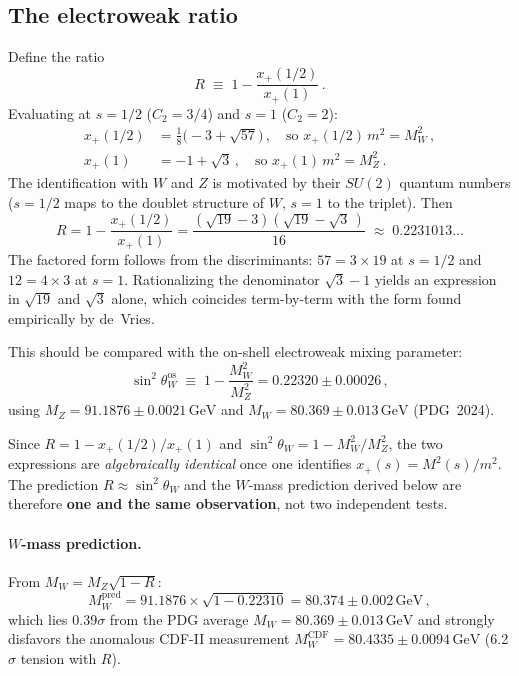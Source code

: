 \documentclass[12pt,a4paper]{article}
\newcommand{\GeV}{\,\text{GeV}}
\begin{document}
\subsection{The electroweak ratio}
Define the ratio
\begin{equation}
R \;\equiv\; 1 - \frac{x_+(1/2)}{x_+(1)}\,.
\end{equation}
Evaluating at $s = 1/2$ ($C_2 = 3/4$)
and $s = 1$ ($C_2 = 2$):
\begin{align}
x_+(1/2) &= \tfrac{1}{8}\bigl(-3 + \sqrt{57}\bigr)
  \,,\quad\text{so } x_+(1/2)\,m^2 = M_W^2\,,
\\[4pt]
x_+(1) &= -1 + \sqrt{3}
  \,,\quad\text{so } x_+(1)\,m^2 = M_Z^2\,.
\end{align}
The identification with $W$ and $Z$ is motivated by their
$SU(2)$ quantum numbers ($s = 1/2$ maps to the doublet structure of $W$,
$s = 1$ to the triplet).  Then
\begin{equation}
\boxed{R = 1 - \frac{x_+(1/2)}{x_+(1)}
  = \frac{(\sqrt{19} - 3)(\sqrt{19} - \sqrt{3}\,)}{16}
  \;\approx\; 0.2231013\ldots}
\end{equation}
The factored form follows from the discriminants:
$57 = 3 \times 19$ at $s = 1/2$ and
$12 = 4 \times 3$ at $s = 1$.  Rationalizing the denominator
$\sqrt{3} - 1$ yields an expression in $\sqrt{19}$ and $\sqrt{3}$
alone, which coincides term-by-term with the form found
empirically by de~Vries.

This should be compared with the on-shell electroweak mixing
parameter:
\begin{equation}
\sin^2\!\theta_W^{\text{os}}
  \;\equiv\; 1 - \frac{M_W^2}{M_Z^2}
  = 0.22320 \pm 0.00026\,,
\end{equation}
using $M_Z = 91.1876 \pm 0.0021\GeV$ and
$M_W = 80.369 \pm 0.013\GeV$ (PDG~2024).

Since $R = 1 - x_+(1/2)/x_+(1)$ and
$\sin^2\!\theta_W = 1 - M_W^2/M_Z^2$, the two expressions are
\emph{algebraically identical} once one identifies
$x_+(s) = M^2(s)/m^2$.  The prediction $R \approx
\sin^2\!\theta_W$ and the $W$-mass prediction derived below are
therefore \textbf{one and the same observation}, not two
independent tests.

\paragraph{$W$-mass prediction.}
From $M_W = M_Z\sqrt{1 - R}$:
\begin{equation}
M_W^{\text{pred}}
  = 91.1876 \times \sqrt{1 - 0.22310}
  = 80.374 \pm 0.002\GeV\,,
\end{equation}
which lies $0.39\sigma$ from the PDG average
$M_W = 80.369 \pm 0.013\GeV$ and strongly disfavors the
anomalous CDF-II measurement $M_W^{\text{CDF}} = 80.4335 \pm
0.0094\GeV$ (6.2$\sigma$ tension with $R$).
\end{document}
